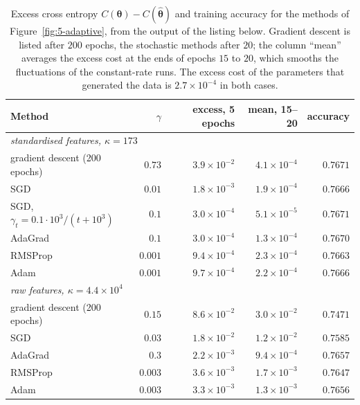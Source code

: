 \begin{table}[htbp]
\centering
\caption{Excess cross entropy $C(\bm{\theta})-C(\hat{\bm{\theta}})$ and
training accuracy for the methods of Figure~\ref{fig:5-adaptive}, from the
output of the listing below.  Gradient descent is listed after $200$ epochs,
the stochastic methods after $20$; the column ``mean'' averages the excess
cost at the ends of epochs $15$ to $20$, which smooths the fluctuations of
the constant-rate runs.  The excess cost of the parameters that generated
the data is $2.7\times10^{-4}$ in both cases.}
\label{tab:5-sgdcompare}
\renewcommand{\arraystretch}{1.2}
\setlength{\tabcolsep}{6pt}
\begin{tabular}{lrrrr}
\toprule
\textbf{Method} & $\gamma$ & \textbf{excess, 5 epochs} & \textbf{mean, 15--20} & \textbf{accuracy}\\
\midrule
\multicolumn{5}{l}{\emph{standardised features, $\kappa=173$}}\\
gradient descent (200 epochs) & $0.73$  & $3.9\times10^{-2}$ & $4.1\times10^{-4}$ & $0.7671$\\
SGD                           & $0.01$  & $1.8\times10^{-3}$ & $1.9\times10^{-4}$ & $0.7666$\\
SGD, $\gamma_t=0.1\cdot10^{3}/(t+10^{3})$ & $0.1$ & $3.0\times10^{-4}$ & $5.1\times10^{-5}$ & $0.7671$\\
AdaGrad                       & $0.1$   & $3.0\times10^{-4}$ & $1.3\times10^{-4}$ & $0.7670$\\
RMSProp                       & $0.001$ & $9.4\times10^{-4}$ & $2.3\times10^{-4}$ & $0.7663$\\
Adam                          & $0.001$ & $9.7\times10^{-4}$ & $2.2\times10^{-4}$ & $0.7666$\\
\midrule
\multicolumn{5}{l}{\emph{raw features, $\kappa=4.4\times10^{4}$}}\\
gradient descent (200 epochs) & $0.15$  & $8.6\times10^{-2}$ & $3.0\times10^{-2}$ & $0.7471$\\
SGD                           & $0.03$  & $1.8\times10^{-2}$ & $1.2\times10^{-2}$ & $0.7585$\\
AdaGrad                       & $0.3$   & $2.2\times10^{-3}$ & $9.4\times10^{-4}$ & $0.7657$\\
RMSProp                       & $0.003$ & $3.6\times10^{-3}$ & $1.7\times10^{-3}$ & $0.7647$\\
Adam                          & $0.003$ & $3.3\times10^{-3}$ & $1.3\times10^{-3}$ & $0.7656$\\
\bottomrule
\end{tabular}
\end{table}


